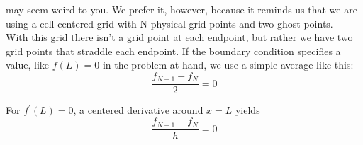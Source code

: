 may seem weird to you. We prefer it, however, because it reminds us that we are
using a cell-centered grid with N physical grid points and two ghost points. \\
With this grid there isn\rq t a grid point at each endpoint, but rather we have two
grid points that straddle each endpoint. If the boundary condition specifies a
value, like $f (L) = 0 $ in the problem at hand, we use a simple average like this:
\begin{equation}\label{eq:46}
		\frac{f_{N+1} + f_N}{2}=0
				\end{equation}	

For $f^\prime (L) = 0$, a centered derivative around $x = L$ yields
\begin{equation}\label{eq:47}
		\frac{f_{N+1} + f_N}{h}=0
				\end{equation}	
			
